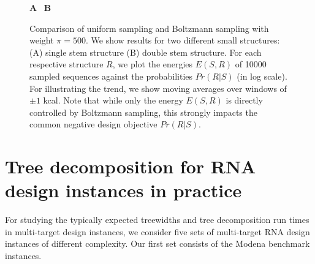 \documentclass[10pt]{article}
\makeatletter
\newlength{\@aligneps}
\newcommand{\includegraphicstop}[2][]{%
\sbox{\@alignepsbox}{\texttt{[image: \#2]}}%
\setlength{\@aligneps}{-\ht\@alignepsbox}%
\addtolength{\@aligneps}{2ex}%
\raisebox{\@aligneps}{\usebox{\@alignepsbox}}}
\newcommand{\Def}[1]{\emph{#1}}
\makeatother
\begin{document}
% 

\begin{figure}[h!]
\textbf{A}~\includegraphicstop[width=0.48\textwidth]{Figs/Plots/stem_weight1-500_mean}%
\textbf{B}~\includegraphicstop[width=0.48\textwidth]{Figs/Plots/doublestem_weight1-500_mean}%
\caption{Comparison of uniform sampling and Boltzmann sampling with
weight $\pi=500$. We show results for two different small structures: (A) single stem structure (B) double stem structure. For each respective structure $R$, we plot the energies $E(S,R)$ of
10000 sampled sequences against the probabilities $Pr(R|S)$ (in log scale). For illustrating the trend, we show moving averages over windows of $\pm 1$ kcal. Note that while only the energy $E(S,R)$ is directly controlled by Boltzmann sampling, this strongly impacts the common negative design objective $Pr(R|S)$.}
\label{fig:negforpos}
\end{figure}

\section{Tree decomposition for RNA design instances in practice}
\label{appsec:treedecomp}

For studying the typically expected treewidths and tree decomposition
run times in multi-target design instances, we consider five sets of
multi-target RNA design instances of different complexity. Our first
set consists of the Modena benchmark instances.
\end{document}
